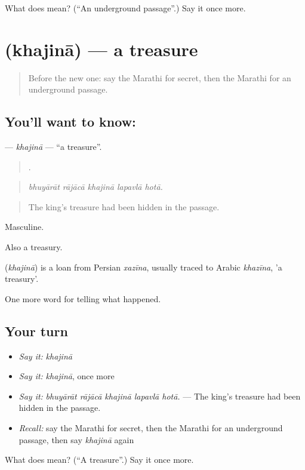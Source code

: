\begin{tcolorbox}[breakable,colback=teal!4,colframe=teal!35!black,title={Before you move on}]
What does  mean? (\textquotedblleft{}An underground passage\textquotedblright{}.) Say it once more.
\end{tcolorbox}
\section[\texorpdfstring{\mr{खजिना} (khajinā)}{खजिना (khajinā)}]{ (khajinā) — a treasure}

\label{lesson:MR-C336-khajina}



\begin{quote}
Before the new one: say the Marathi for secret, then the Marathi for an underground passage.
\end{quote}

\subsection*{You'll want to know: }
\textbf{} — \emph{khajinā} — \textquotedblleft{}a treasure\textquotedblright{}.

\begin{quote}
    .
\end{quote}

\begin{quote}
\emph{bhuyārāt rājācā khajinā lapavlā hotā.}
\end{quote}

\begin{quote}
The king's treasure had been hidden in the passage.
\end{quote}

Masculine.

Also a treasury.

\begin{cousinweb}
\textbf{} (\emph{khajinā}) is a loan from Persian \emph{xazīna}, usually traced to Arabic \emph{khazīna}, 'a treasury'.
\end{cousinweb}

\begin{grammarlens}[title={What you've built}]
One more word for telling what happened.
\end{grammarlens}

\subsection*{Your turn}
\begin{itemize}
\raggedright
  \item \emph{Say it:} \emph{khajinā}
  \item \emph{Say it:} \emph{khajinā}, once more
  \item \emph{Say it:} \emph{bhuyārāt rājācā khajinā lapavlā hotā.} — The king's treasure had been hidden in the passage.
  \item \emph{Recall:} say the Marathi for secret, then the Marathi for an underground passage, then say \emph{khajinā} again
\end{itemize}

\begin{tcolorbox}[breakable,colback=teal!4,colframe=teal!35!black,title={Before you move on}]
What does  mean? (\textquotedblleft{}A treasure\textquotedblright{}.) Say it once more.
\end{tcolorbox}
